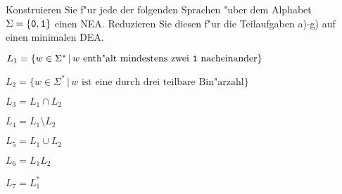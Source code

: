 Konstruieren Sie f"ur jede der folgenden Sprachen "uber dem Alphabet
$\Sigma=\{{\tt 0},{\tt 1}\}$ einen NEA. Reduzieren Sie diesen f"ur die
Teilaufgaben a)-g) auf einen minimalen DEA.
\begin{teilaufgaben}
\item $L_1=\{w\in\Sigma^*\,|\,\text{$w$ enth"alt mindestens zwei {\tt 1} nacheinander}\}$
\item $L_2=\{w\in\Sigma^*\,|\,\text{$w$ ist eine durch drei teilbare Bin"arzahl}\}$
\item $L_3=L_1\cap L_2$
\item $L_4=L_1\setminus L_2$
\item $L_5=L_1\cup L_2$
\item $L_6=L_1L_2$
\item $L_7=L_1^*$
\end{teilaufgaben}

